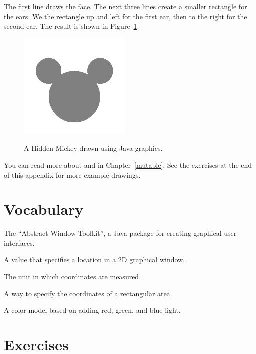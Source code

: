 The first line draws the face.
The next three lines create a smaller rectangle for the ears.
We  the rectangle up and left for the first ear, then to the right for the second ear.
The result is shown in Figure~\ref{fig.mickey}.

\begin{figure}[!ht]
\begin{center}
\includegraphics[height=2in,alt={Drawing of a Hidden Mickey Mouse icon created with Java graphics, showing a large oval face with two smaller oval ears positioned at the top}]{figs/mickey.png}
\caption{A Hidden Mickey drawn using Java graphics.}
\label{fig.mickey}
\end{center}
\end{figure}

You can read more about  and  in Chapter~\ref{mutable}.
See the exercises at the end of this appendix for more example drawings.


\section{Vocabulary}

\begin{description}

The ``Abstract Window Toolkit'', a Java package for creating graphical user interfaces.

A value that specifies a location in a 2D graphical window.

The unit in which coordinates are measured.

A way to specify the coordinates of a rectangular area.

A color model based on adding red, green, and blue light.

\end{description}


\section{Exercises}

